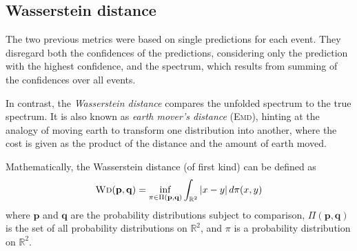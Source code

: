 \subsection{Wasserstein distance} \label{sec:unfolding:metrics:wd}
The two previous metrics were based on single predictions for each event.
They disregard both
  the confidences of the predictions,
    considering only the prediction with the highest confidence,
  and the spectrum,
    which results from summing of the confidences over all events.

In contrast,
the \emph{Wasserstein distance} \cite{wd}
compares the unfolded spectrum to the true spectrum.
%
It is also known as \emph{earth mover's distance} (\textsc{Emd}),
  hinting at the analogy of moving earth to transform one distribution into another,
    where the cost is given as the product of the distance and the amount of earth moved.

Mathematically, the Wasserstein distance (of first kind) can be defined as
\begin{equation}
  \text{\textsc{Wd}}(\mathbf{p}, \mathbf{q}) = \inf_{\pi \in \Pi(\mathbf{p}, \mathbf{q})} \int_{\mathbb{R}^2} |x - y| \, d\pi(x, y)
\end{equation}
where
  $\mathbf{p}$ and $\mathbf{q}$ are the probability distributions subject to comparison,
  $\Pi(\mathbf{p}, \mathbf{q})$ is the set of all probability distributions on $\mathbb{R}^2$,
  and $\pi$ is a probability distribution on $\mathbb{R}^2$.
